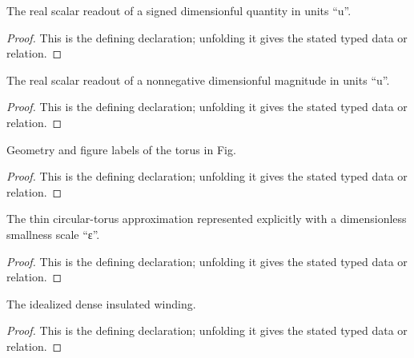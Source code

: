 \begin{definition}[signedReadout]
  \label{decl:physics:IPhO_2026_3_A_2:signedReadout}
  The real scalar readout of a signed dimensionful quantity in units “u”.
\end{definition}
\begin{proof}
  This is the defining declaration; unfolding it gives the stated typed data or relation.
\end{proof}

\begin{definition}[magnitudeReadout]
  \label{decl:physics:IPhO_2026_3_A_2:magnitudeReadout}
  The real scalar readout of a nonnegative dimensionful magnitude in units “u”.
\end{definition}
\begin{proof}
  This is the defining declaration; unfolding it gives the stated typed data or relation.
\end{proof}

\begin{definition}[TorusGeometry]
  \label{decl:physics:IPhO_2026_3_A_2:TorusGeometry}
  Geometry and figure labels of the torus in Fig.
\end{definition}
\begin{proof}
  This is the defining declaration; unfolding it gives the stated typed data or relation.
\end{proof}

\begin{definition}[IsThinCircularTorus]
  \label{decl:physics:IPhO_2026_3_A_2:IsThinCircularTorus}
  The thin circular-torus approximation represented explicitly with a dimensionless smallness scale “ε”.
\end{definition}
\begin{proof}
  This is the defining declaration; unfolding it gives the stated typed data or relation.
\end{proof}

\begin{definition}[IdealToroidalWinding]
  \label{decl:physics:IPhO_2026_3_A_2:IdealToroidalWinding}
  The idealized dense insulated winding.
\end{definition}
\begin{proof}
  This is the defining declaration; unfolding it gives the stated typed data or relation.
\end{proof}

